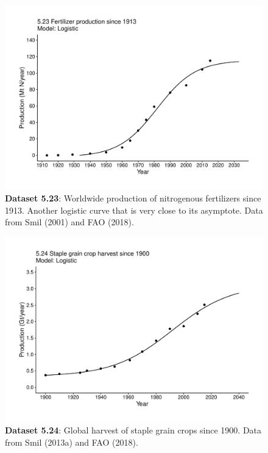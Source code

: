 \documentclass[aps,rmp,preprint,superscriptaddress,10pt,onecolumn]{article}
\begin{document}
\clearpage
\begin{figure}[h]
\includegraphics[width=\textwidth]{output/figs-ggplot/5.23.pdf}
\caption{\textbf{Dataset 5.23}: Worldwide production of nitrogenous fertilizers since 1913. Another logistic curve that is very close to its asymptote. Data from Smil (2001) and FAO (2018).}
\end{figure}
	
\clearpage
\begin{figure}[h]
\includegraphics[width=\textwidth]{output/figs-ggplot/5.24.pdf}
\caption{\textbf{Dataset 5.24}: Global harvest of staple grain crops since 1900. Data from Smil (2013a) and FAO (2018).}
\end{figure}
	
\end{document}
